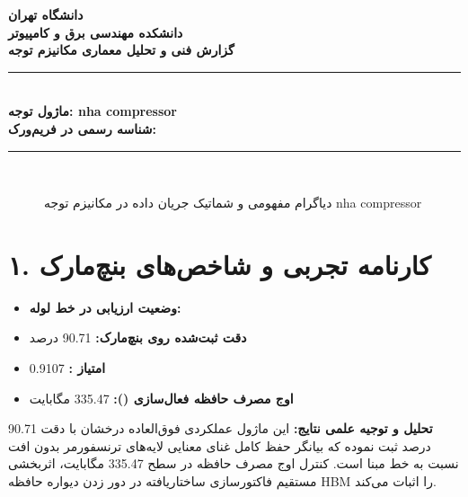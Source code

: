 \documentclass[12pt,a4paper]{article}
\begin{document}
\begin{center}
{\Large\bfseries دانشگاه تهران}\\[0.2cm]
{\large\bfseries دانشکده مهندسی برق و کامپیوتر}\\[0.2cm]
{\large\bfseries گزارش فنی و تحلیل معماری مکانیزم توجه}\\[0.5cm]
\rule{\linewidth}{1pt}\\[0.3cm]
{\LARGE\bfseries ماژول توجه: nha compressor}\\[0.2cm]
{\large \textbf{شناسه رسمی در فریم‌ورک:} }\\[0.2cm]
\rule{\linewidth}{1pt}\\[0.5cm]
\end{center}

\begin{figure}[H]
\centering
{}
\caption{دیاگرام مفهومی و شماتیک جریان داده در مکانیزم توجه nha compressor}
\end{figure}

\section*{۱. کارنامه تجربی و شاخص‌های بنچ‌مارک}
\begin{itemize}
\item \textbf{وضعیت ارزیابی در خط لوله:} 
\item \textbf{دقت ثبت‌شده روی بنچ‌مارک:} 90.71 درصد
\item \textbf{امتیاز :} 0.9107
\item \textbf{اوج مصرف حافظه فعال‌سازی ():} 335.47 مگابایت
\end{itemize}
\textbf{تحلیل و توجیه علمی نتایج:} این ماژول عملکردی فوق‌العاده درخشان با دقت 90.71 درصد ثبت نموده که بیانگر حفظ کامل غنای معنایی لایه‌های ترنسفورمر بدون افت نسبت به خط مبنا است. کنترل اوج مصرف حافظه در سطح 335.47 مگابایت، اثربخشی مستقیم فاکتورسازی ساختاریافته در دور زدن دیواره حافظه HBM را اثبات می‌کند.
\end{document}
